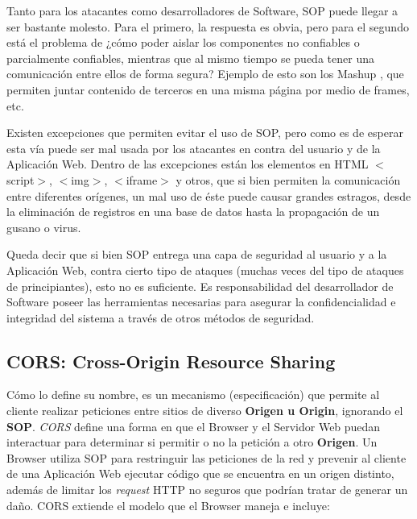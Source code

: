     
    Tanto para los atacantes como desarrolladores de Software, SOP puede llegar a ser bastante molesto. Para el primero, la respuesta es obvia, pero para el segundo está el problema de ¿cómo poder aislar los componentes no confiables o parcialmente confiables, mientras que al mismo tiempo se pueda tener una comunicación entre ellos de forma segura? Ejemplo de esto son los Mashup \cite{barth2009securing}, que permiten juntar contenido de terceros en una misma página por medio de frames, etc. 
        
    Existen excepciones que permiten evitar el uso de SOP, pero como es de esperar esta vía puede ser mal usada por los atacantes en contra del usuario y de la Aplicación Web. Dentro de las excepciones están los elementos en HTML \(<\)script\(>\), \(<\)img\(>\), \(<\)iframe\(>\) y otros, que si bien permiten la comunicación entre diferentes orígenes, un mal uso de éste puede causar grandes estragos, desde la eliminación de registros en una base de datos hasta la propagación de un gusano o virus.
        
    Queda decir que si bien SOP entrega una capa de seguridad al usuario y a la Aplicación Web, contra cierto tipo de ataques (muchas veces del tipo de ataques de principiantes), esto no es suficiente. Es responsabilidad del desarrollador de Software poseer las herramientas necesarias para asegurar la confidencialidad e integridad del sistema a través de otros métodos de seguridad.



\subsection{CORS: Cross-Origin Resource Sharing}
\label{chap2:CORS}
    Cómo lo define su nombre, es un mecanismo (especificación) que permite al cliente realizar peticiones entre sitios de diverso \textbf{Origen u Origin}, ignorando el \textbf{SOP}. \textit{CORS} define una forma en que el Browser y el Servidor Web puedan interactuar para determinar si permitir o no la petición a otro \textbf{Origen}. Un Browser utiliza SOP para restringuir las peticiones de la red y prevenir al cliente de una Aplicación Web ejecutar código que se encuentra en un origen distinto, además de limitar los \textit{request} HTTP no seguros que podrían tratar de generar un daño. CORS extiende el modelo que el Browser maneja e incluye:
        
